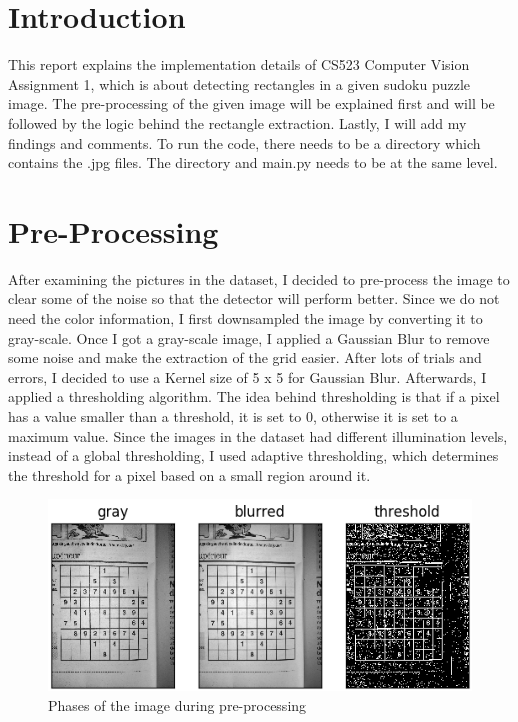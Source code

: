 \section*{Introduction}

This report explains the implementation details of CS523 Computer Vision Assignment 1, which is about detecting rectangles in a given sudoku puzzle image. The pre-processing of the given image will be explained first and will be followed by the logic behind the rectangle extraction. Lastly, I will add my findings and comments. To run the code, there needs to be a directory which contains the .jpg files. The directory and main.py needs to be at the same level. 


\section*{Pre-Processing}

After examining the pictures in the dataset, I decided to pre-process the image to clear some of the noise so that the detector will perform better. Since we do not need the color information, I first downsampled the image by converting it to gray-scale. Once I got a gray-scale image, I applied a Gaussian Blur to remove some noise and make the extraction of the grid easier. After lots of trials and errors, I decided to use a Kernel size of 5 x 5 for Gaussian Blur. Afterwards, I applied a
thresholding algorithm. The idea behind thresholding is that if a pixel has a value smaller than a threshold, it is set to 0, otherwise it is set to a maximum value. Since the images in the dataset had different illumination levels, instead of a global thresholding, I used adaptive thresholding, which determines the threshold for a pixel based on a small region around it.

\begin{figure}[H]
    \centering
    \includegraphics[width=\textwidth]{images/preprocess.png}
    \caption{Phases of the image during pre-processing}
    \setlength{\belowcaptionskip}{-20pt}
    \setlength{\abovecaptionskip}{-20pt}
\end{figure}

